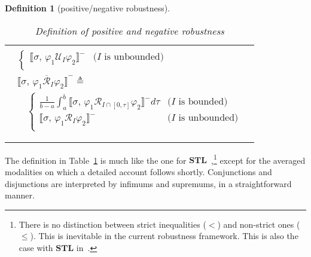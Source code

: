 \documentclass[envcountsect,orivec]{llncs} \usepackage{etex} \usepackage[]{graphicx}
\newtheorem{mydefinition}[mytheorem]{Definition}
\newcommand{\STL}{\textbf{STL}}
\newcommand{\UntilOp}[1]{\mathbin{\mathcal{U}_{#1}}}
\newcommand{\Release}[1]{\mathbin{\mathcal{R}_{#1}}}
\newcommand{\TRelease}[1]{\mathbin{\overline{\mathcal{R}}_{#1}}}
\newcommand{\Robust}[2]{{ \llbracket #1,\, #2 \rrbracket}}
\newcommand{\Defeq}{\triangleq}
\newcommand{\Frac}[2]{{\displaystyle{\frac{#1}{#2}}}}
\newcommand{\Int}{\displaystyle \int}
\begin{document}
\begin{mydefinition}[positive/negative robustness]
\begin{table}[t]
\begin{tabular}{l}
{\begin{math}
\begin{array}{l}
\begin{array}{l}
\begin{cases}
            \Robust{\sigma}{\varphi_1 \UntilOp{I} \varphi_2}^{-} &
            \text{($I$ is unbounded)}\\
          \end{cases}\\
          \Robust{\sigma}{\varphi_1 \TRelease{I} \varphi_2}^{-}  \Defeq\\
          \quad
          \begin{cases}
            \Frac{1}{b - a} \Int_{a}^{b} \Robust{\sigma}{\varphi_1 \Release{I \cap [0, \tau]} \varphi_2}^{-} d\tau 
            & \text{($I$ is bounded)}\\
            \Robust{\sigma}{\varphi_1 \Release{I} \varphi_2}^{-} &
            \text{($I$ is unbounded)}\\
          \end{cases}\\
        \end{array}
      \end{array}
    \end{math}
    }
 \end{tabular}
 \caption{Definition of positive and negative robustness}
 \label{table:robustness}
\end{table}
\end{mydefinition}
The definition in Table~\ref{table:robustness} is much like the one for
$\STL$~\cite{DBLP:conf/formats/DonzeM10,DBLP:conf/cav/DonzeFM13},\footnote{
  There is no distinction between strict inequalities ($<$) and
  non-strict ones ($\le$). This is inevitable in the current
  robustness framework. This is also the case with $\STL$
  in~\cite{DBLP:conf/formats/DonzeM10,DBLP:conf/cav/DonzeFM13}. }  
except for the averaged modalities on which a detailed account follows shortly.
Conjunctions and
disjunctions are interpreted by infimums and supremums, in a
straightforward manner.
\end{document}
